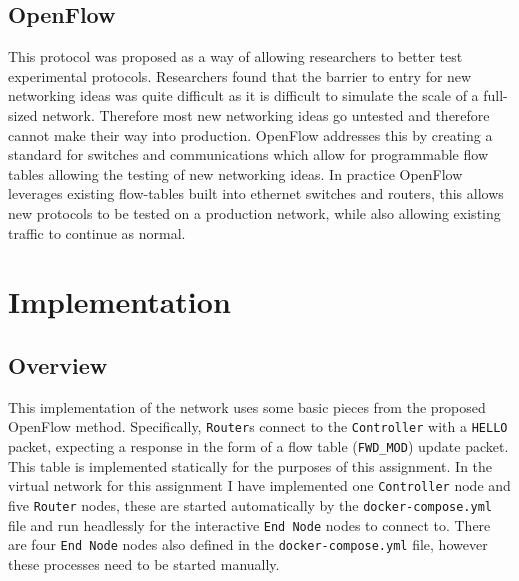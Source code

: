 \documentclass{article}
\newcommand{\code}[1]{\texttt{#1}}
\begin{document}
\subsection{OpenFlow}
\label{subsec:openflow}
This protocol was proposed as a way of allowing researchers to better test experimental protocols. Researchers found that the barrier to entry for new networking ideas was quite difficult as it is difficult to simulate the scale of a full-sized network. Therefore most new networking ideas go untested and therefore cannot make their way into production. OpenFlow addresses this by creating a standard for switches and communications which allow for programmable flow tables allowing the testing of new networking ideas. In practice OpenFlow leverages existing flow-tables built into ethernet switches and routers, this allows new protocols to be tested on a production network, while also allowing existing traffic to continue as normal. 

\vspace{1cm}
\section{Implementation}
\subsection{Overview}
This implementation of the network uses some basic pieces from the proposed OpenFlow method. Specifically, \code{Router}s connect to the \code{Controller} with a \code{HELLO} packet, expecting a response in the form of a flow table (\code{FWD\_MOD}) update packet. This table is implemented statically for the purposes of this assignment. In the virtual network for this assignment I have implemented one \code{Controller} node and five \code{Router} nodes, these are started automatically by the \code{docker-compose.yml} file and run headlessly for the interactive \code{End Node} nodes to connect to. There are four \code{End Node} nodes also defined in the \code{docker-compose.yml} file, however these processes need to be started manually.
\end{document}
